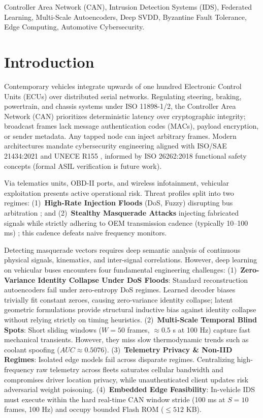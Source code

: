 \documentclass[conference]{IEEEtran}
\begin{document}
\begin{IEEEkeywords}
Controller Area Network (CAN), Intrusion Detection Systems (IDS), Federated Learning, Multi-Scale Autoencoders, Deep SVDD, Byzantine Fault Tolerance, Edge Computing, Automotive Cybersecurity.
\end{IEEEkeywords}

\section{Introduction}

Contemporary vehicles integrate upwards of one hundred Electronic Control Units (ECUs) over distributed serial networks. Regulating steering, braking, powertrain, and chassis systems under ISO 11898-1/2, the Controller Area Network (CAN) prioritizes deterministic latency over cryptographic integrity; broadcast frames lack message authentication codes (MACs), payload encryption, or sender metadata. Any tapped node can inject arbitrary frames. Modern architectures mandate cybersecurity engineering aligned with ISO/SAE 21434:2021 \cite{iso21434} and UNECE R155 \cite{unece155}, informed by ISO 26262:2018 \cite{iso26262} functional safety concepts (formal ASIL verification is future work).

Via telematics units, OBD-II ports, and wireless infotainment, vehicular exploitation presents active operational risk. Threat profiles split into two regimes: (1)~\textbf{High-Rate Injection Floods} (DoS, Fuzzy) disrupting bus arbitration \cite{song2020carhacking}; and (2)~\textbf{Stealthy Masquerade Attacks} injecting fabricated signals while strictly adhering to OEM transmission cadence (typically 10--100 ms) \cite{verma2022road}; this cadence defeats naive frequency monitors.

Detecting masquerade vectors requires deep semantic analysis of continuous physical signals, kinematics, and inter-signal correlations. However, deep learning on vehicular buses encounters four fundamental engineering challenges:
(1)~\textbf{Zero-Variance Identity Collapse Under DoS Floods}: Standard reconstruction autoencoders fail under zero-entropy DoS regimes. Learned decoder biases trivially fit constant zeroes, causing zero-variance identity collapse; latent geometric formulations provide structural inductive bias against identity collapse without relying strictly on timing heuristics.
(2)~\textbf{Multi-Scale Temporal Blind Spots}: Short sliding windows ($W=50$ frames, $\approx 0.5$ s at 100 Hz) capture fast mechanical transients. However, they miss slow thermodynamic trends such as coolant spoofing ($AUC \approx 0.5076$).
(3)~\textbf{Telemetry Privacy \& Non-IID Regimes}: Isolated edge models fail across disparate regimes. Centralizing high-frequency raw telemetry across fleets saturates cellular bandwidth and compromises driver location privacy, while unauthenticated client updates risk adversarial weight poisoning.
(4)~\textbf{Embedded Edge Feasibility}: In-vehicle IDS must execute within the hard real-time CAN window stride (100 ms at $S=10$ frames, 100 Hz) and occupy bounded Flash ROM ($\le 512$ KB).
\end{document}
